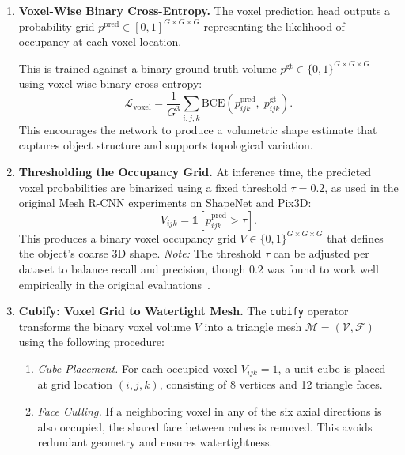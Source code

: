 \begin{enumerate}[label=\textbf{Step \arabic*:}, leftmargin=1.8em, resume]
    
    \item \textbf{Voxel-Wise Binary Cross-Entropy.}  
    The voxel prediction head outputs a probability grid \( p^{\text{pred}} \in [0,1]^{G \times G \times G} \) representing the likelihood of occupancy at each voxel location.  
    
    This is trained against a binary ground-truth volume \( p^{\text{gt}} \in \{0,1\}^{G \times G \times G} \) using voxel-wise binary cross-entropy:
    \[
    \mathcal{L}_{\text{voxel}} = \frac{1}{G^3} \sum_{i,j,k} \mathrm{BCE}(p^{\text{pred}}_{ijk},\; p^{\text{gt}}_{ijk}).
    \]
    This encourages the network to produce a volumetric shape estimate that captures object structure and supports topological variation.
    
    \newpage
    
    \item \textbf{Thresholding the Occupancy Grid.}  
    At inference time, the predicted voxel probabilities are binarized using a fixed threshold \( \tau = 0.2 \), as used in the original Mesh R-CNN experiments on ShapeNet and Pix3D:
    \[
    V_{ijk} = \mathbb{1}[p^{\text{pred}}_{ijk} > \tau].
    \]
    This produces a binary voxel occupancy grid \( V \in \{0,1\}^{G \times G \times G} \) that defines the object's coarse 3D shape.  
    \emph{Note:} The threshold \( \tau \) can be adjusted per dataset to balance recall and precision, though \( 0.2 \) was found to work well empirically in the original evaluations~\cite{gkioxari2020_meshrcnn}.
    
    \item \textbf{Cubify: Voxel Grid to Watertight Mesh.}  
    The \texttt{cubify} operator~\cite{gkioxari2020_meshrcnn} transforms the binary voxel volume \( V \) into a triangle mesh \( \mathcal{M} = (\mathcal{V}, \mathcal{F}) \) using the following procedure:
    \begin{enumerate}[label*=\alph*., leftmargin=1.2em]
        \item \emph{Cube Placement.}  
        For each occupied voxel \( V_{ijk} = 1 \), a unit cube is placed at grid location \( (i, j, k) \), consisting of 8 vertices and 12 triangle faces.
        
        \item \emph{Face Culling.}  
        If a neighboring voxel in any of the six axial directions is also occupied, the shared face between cubes is removed. This avoids redundant geometry and ensures watertightness.
        

\end{enumerate}
\end{enumerate}
